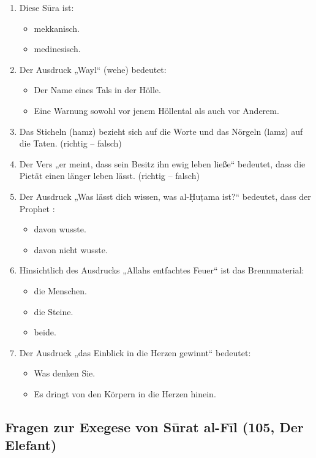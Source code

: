 \begin{enumerate}[leftmargin=1.6em,resume]
\item Diese Sūra ist:
  \begin{itemize}
    \item mekkanisch. \item medinesisch.
  \end{itemize}
\item Der Ausdruck „Wayl“ (wehe) bedeutet:
  \begin{itemize}
    \item Der Name eines Tals in der Hölle.
    \item Eine Warnung sowohl vor jenem Höllental als auch vor Anderem.
  \end{itemize}
\item Das Sticheln (hamz) bezieht sich auf die Worte und das Nörgeln (lamz) auf die Taten.
  (richtig -- falsch)
\item Der Vers „er meint, dass sein Besitz ihn ewig leben ließe“ bedeutet, dass die Pietät einen
  länger leben lässt. (richtig -- falsch)
\item Der Ausdruck „Was lässt dich wissen, was al-Ḥuṭama ist?“ bedeutet, dass der Prophet
  :
  \begin{itemize}
    \item davon wusste. \item davon nicht wusste.
  \end{itemize}
\item Hinsichtlich des Ausdrucks „Allahs entfachtes Feuer“ ist das Brennmaterial:
  \begin{itemize}
    \item die Menschen. \item die Steine. \item beide.
  \end{itemize}
\item Der Ausdruck „das Einblick in die Herzen gewinnt“ bedeutet:
  \begin{itemize}
    \item Was denken Sie. \item Es dringt von den Körpern in die Herzen hinein.
  \end{itemize}
\end{enumerate}

\subsection*{Fragen zur Exegese von Sūrat al-Fīl (105, Der Elefant)}

